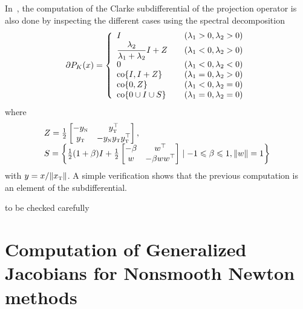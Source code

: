 In~\cite{Hayashi.ea_SIOPT2005}, the computation of the Clarke subdifferential of the projection operator is also done by inspecting the different cases using the spectral decomposition
\begin{equation}
  \label{eq:Jordan-projection-Jacobian}
  \partial P_K(x) =
  \left\{
    \begin{array}{ll}
      I & \quad (\lambda_1>0, \lambda_2 >0 ) \\
      \Frac{\lambda_2}{\lambda_1+\lambda_2} I +Z & \quad (\lambda_1< 0, \lambda_2 >0 ) \\
      0 & \quad (\lambda_1< 0, \lambda_2 <0 ) \\
      \co\{I, I+Z\} & \quad (\lambda_1=0, \lambda_2 >0 ) \\
      \co\{0, Z\} & \quad (\lambda_1<0, \lambda_2 =0 ) \\
      \co\{0 \cup  I \cup S\}  & \quad (\lambda_1=0, \lambda_2 =0 )
    \end{array}
  \right.
\end{equation}
where
\begin{equation}
  \label{eq:Jordan-projection-Jacobian2}
  \begin{array}{l}
  Z  = \frac 1 2
  \begin{bmatrix}
    - y_\n & y_\t^\top\\
    y_\t & - y_\n y_\t y_\t^\top
  \end{bmatrix},\\
  S = \left\{\frac 1 2 (1+\beta) I + \frac 1 2
    \begin{bmatrix}
      -\beta & w^\top \\
      w & -\beta w w^\top
    \end{bmatrix}\mid -1 \leq \beta \leq 1, \|w\|=1\right\}
\end{array}
\end{equation}
with $y = x / \|x_{\hbox{\tiny{T}}}\|$. A simple verification shows that the previous computation is an element of the subdifferential.



\begin{ndrva}
  to be checked carefully
\end{ndrva}





\section{Computation of Generalized Jacobians for Nonsmooth Newton methods}
